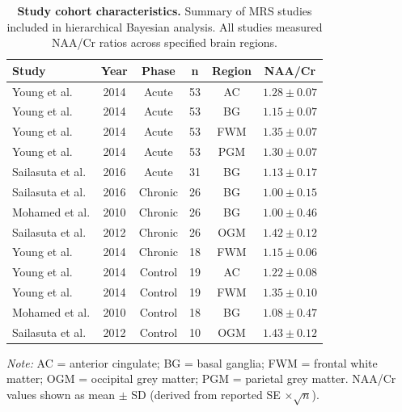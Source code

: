 \documentclass[10pt,a4paper]{article}
\begin{document}
\begin{table}[htbp]
\centering
\caption{\textbf{Study cohort characteristics.} Summary of MRS studies included in hierarchical Bayesian analysis. All studies measured NAA/Cr ratios across specified brain regions.}
\label{tab:cohorts}
\begin{tabular}{lccccc}
\toprule
\textbf{Study} & \textbf{Year} & \textbf{Phase} & \textbf{n} & \textbf{Region} & \textbf{NAA/Cr} \\
\midrule
Young et al. & 2014 & Acute & 53 & AC & $1.28 \pm 0.07$ \\
Young et al. & 2014 & Acute & 53 & BG & $1.15 \pm 0.07$ \\
Young et al. & 2014 & Acute & 53 & FWM & $1.35 \pm 0.07$ \\
Young et al. & 2014 & Acute & 53 & PGM & $1.30 \pm 0.07$ \\
Sailasuta et al. & 2016 & Acute & 31 & BG & $1.13 \pm 0.17$ \\
\midrule
Sailasuta et al. & 2016 & Chronic & 26 & BG & $1.00 \pm 0.15$ \\
Mohamed et al. & 2010 & Chronic & 26 & BG & $1.00 \pm 0.46$ \\
Sailasuta et al. & 2012 & Chronic & 26 & OGM & $1.42 \pm 0.12$ \\
Young et al. & 2014 & Chronic & 18 & FWM & $1.15 \pm 0.06$ \\
\midrule
Young et al. & 2014 & Control & 19 & AC & $1.22 \pm 0.08$ \\
Young et al. & 2014 & Control & 19 & FWM & $1.35 \pm 0.10$ \\
Mohamed et al. & 2010 & Control & 18 & BG & $1.08 \pm 0.47$ \\
Sailasuta et al. & 2012 & Control & 10 & OGM & $1.43 \pm 0.12$ \\
\bottomrule
\end{tabular}
\smallskip

\noindent\textit{Note:} AC = anterior cingulate; BG = basal ganglia; FWM = frontal white matter; OGM = occipital grey matter; PGM = parietal grey matter. NAA/Cr values shown as mean $\pm$ SD (derived from reported SE $\times \sqrt{n}$).
\end{table}
\end{document}
